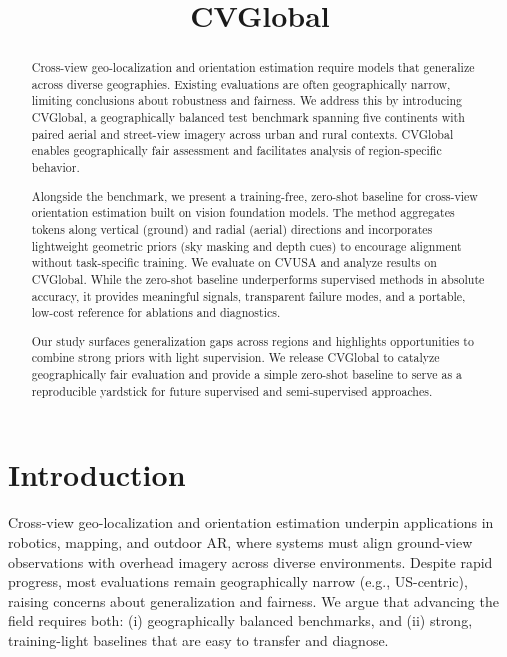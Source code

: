\documentclass{bmvc2k}
\title{CVGlobal}
\begin{document}
\maketitle

\begin{abstract}
Cross-view geo-localization and orientation estimation require models that generalize across diverse geographies. Existing evaluations are often geographically narrow, limiting conclusions about robustness and fairness. We address this by introducing CVGlobal, a geographically balanced test benchmark spanning five continents with paired aerial and street-view imagery across urban and rural contexts. CVGlobal enables geographically fair assessment and facilitates analysis of region-specific behavior.

Alongside the benchmark, we present a training-free, zero-shot baseline for cross-view orientation estimation built on vision foundation models. The method aggregates tokens along vertical (ground) and radial (aerial) directions and incorporates lightweight geometric priors (sky masking and depth cues) to encourage alignment without task-specific training. We evaluate on CVUSA and analyze results on CVGlobal. While the zero-shot baseline underperforms supervised methods in absolute accuracy, it provides meaningful signals, transparent failure modes, and a portable, low-cost reference for ablations and diagnostics.

Our study surfaces generalization gaps across regions and highlights opportunities to combine strong priors with light supervision. We release CVGlobal to catalyze geographically fair evaluation and provide a simple zero-shot baseline to serve as a reproducible yardstick for future supervised and semi-supervised approaches.
\end{abstract}

\section{Introduction}
\label{sec:intro}

Cross-view geo-localization and orientation estimation underpin applications in robotics, mapping, and outdoor AR, where systems must align ground-view observations with overhead imagery across diverse environments. Despite rapid progress, most evaluations remain geographically narrow (e.g., US-centric), raising concerns about generalization and fairness. We argue that advancing the field requires both: (i) geographically balanced benchmarks, and (ii) strong, training-light baselines that are easy to transfer and diagnose.
\end{document}
